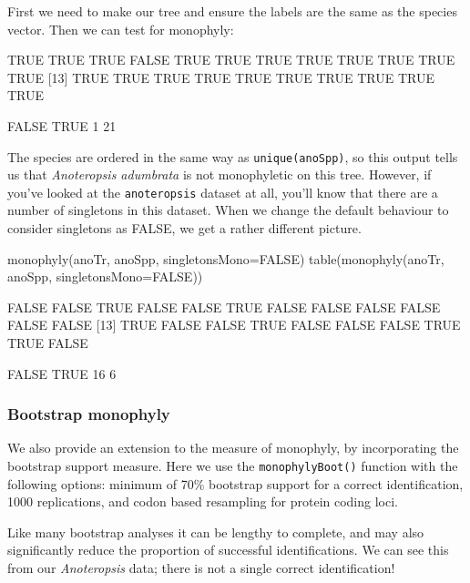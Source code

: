 \documentclass{article}
\newcommand{\scinm}{\emph}
\newcommand{\fun}[1]{\texttt{#1}}
\begin{document}
First we need to make our tree and ensure the labels are the same as the species vector. Then we can test for monophyly:


\begin{Routput}
 [1]  TRUE  TRUE  TRUE FALSE  TRUE  TRUE  TRUE  TRUE  TRUE  TRUE  TRUE  TRUE
[13]  TRUE  TRUE  TRUE  TRUE  TRUE  TRUE  TRUE  TRUE  TRUE  TRUE

FALSE  TRUE 
    1    21
\end{Routput}

The species are ordered in the same way as \fun{unique(anoSpp)}, so this output tells us that \scinm{Anoteropsis adumbrata} is not monophyletic on this tree. However, if you've looked at the \fun{anoteropsis} dataset at all, you'll know that there are a number of singletons in this dataset. When we change the default behaviour to consider singletons as FALSE, we get a rather different picture.

\begin{console}
monophyly(anoTr, anoSpp, singletonsMono=FALSE)
table(monophyly(anoTr, anoSpp, singletonsMono=FALSE))
\end{console}

\begin{Routput}
 [1] FALSE FALSE  TRUE FALSE FALSE  TRUE FALSE FALSE FALSE FALSE FALSE FALSE
[13]  TRUE FALSE FALSE  TRUE FALSE FALSE FALSE  TRUE  TRUE FALSE

FALSE  TRUE 
   16     6 
\end{Routput}

\subsubsection{Bootstrap monophyly}

We also provide an extension to the measure of monophyly, by incorporating the bootstrap support measure. Here we use the \fun{monophylyBoot()} function with the following options: minimum of 70\% bootstrap support for a correct identification, 1000 replications, and codon based resampling for protein coding loci. 

Like many bootstrap analyses it can be lengthy to complete, and may also significantly reduce the proportion of successful identifications. We can see this from our \emph{Anoteropsis} data; there is not a single correct identification!
\end{document}
